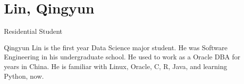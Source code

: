 \section{Lin, Qingyun}

Residential Student
		
Qingyun Lin is the first year Data Science major student. He was Software Engineering in his undergraduate school. 
He used to work as a Oracle DBA for years in China. 
He is familiar with Linux, Oracle, C, R, Java, and learning Python, now.
